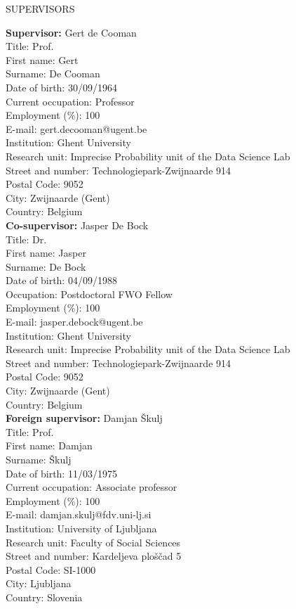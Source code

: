 \documentclass[11pt,dvipsnames,usenames,a4paper]{article}
\begin{document}
\begin{shaded}\centering SUPERVISORS \end{shaded}
\vspace{2pt}

\textbf{Supervisor:} Gert de Cooman\\
Title: Prof.\\
First name: Gert\\
Surname: De Cooman\\
Date of birth: 30/09/1964\\
Current occupation: Professor\\
Employment (\%): 100\\
E-mail: gert.decooman@ugent.be\\
Institution: Ghent University\\
Research unit: Imprecise Probability unit of the Data Science Lab\\
Street and number: Technologiepark-Zwijnaarde 914\\
Postal Code: 9052\\
City: Zwijnaarde (Gent)\\
Country: Belgium\\[7pt]
\textbf{Co-supervisor:} Jasper De Bock\\
Title: Dr.\\
First name: Jasper\\
Surname: De Bock\\
Date of birth: 04/09/1988\\
Occupation: Postdoctoral FWO Fellow\\
Employment (\%): 100\\
E-mail: jasper.debock@ugent.be\\
Institution: Ghent University\\
Research unit: Imprecise Probability unit of the Data Science Lab\\
Street and number: Technologiepark-Zwijnaarde 914\\
Postal Code: 9052\\
City: Zwijnaarde (Gent)\\
Country: Belgium\\[7pt]
\textbf{Foreign supervisor:} Damjan {\v S}kulj\\
Title: Prof.\\
First name: Damjan\\
Surname: {\v S}kulj\\
Date of birth: {11/03/1975}\\
Current occupation: {Associate professor}\\
Employment (\%): {100}\\
E-mail: {damjan.skulj@fdv.uni-lj.si}\\
Institution: University of Ljubljana\\
Research unit: {Faculty of Social Sciences}\\
Street and number: {Kardeljeva plo\v s\v cad 5}\\
Postal Code: {SI-1000}\\
City: {Ljubljana}\\
Country: {Slovenia}\\%
\end{document}
